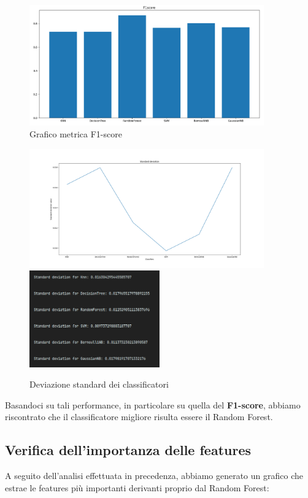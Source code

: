 \documentclass{article}
\begin{document}
\begin{figure}[H]
        \includegraphics[width=0.9\textwidth]{F1score}
        \centering
        \caption{Grafico metrica F1-score}
        \centering
\end{figure}
%

\begin{figure}[H]
        \includegraphics[width=0.9\textwidth]{dev2}
        \includegraphics[width=0.5\textwidth]{dev1}
        \centering
        \caption{Deviazione standard dei classificatori}
        \centering
\end{figure}
%


\noindent
Basandoci su tali performance, in particolare su quella del \textbf{F1-score}, abbiamo riscontrato che il classificatore migliore risulta essere il Random Forest.

\subsection{Verifica dell'importanza delle features}
A seguito dell'analisi effettuata in precedenza, abbiamo generato un grafico che estrae le features più importanti derivanti proprio dal Random Forest:  
\end{document}
